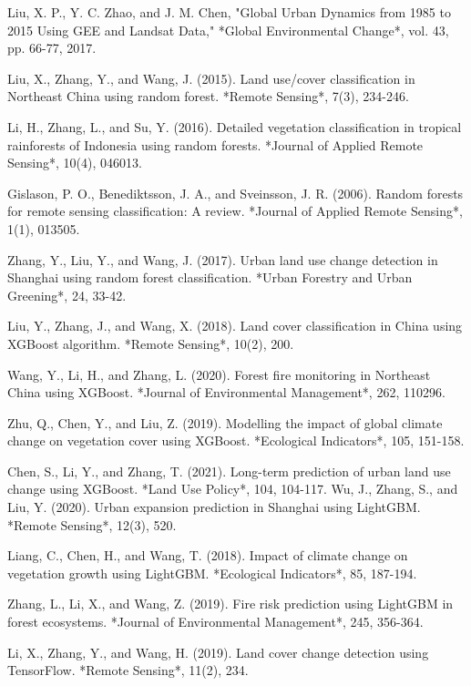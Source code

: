 \documentclass{article}
\begin{document}
\begin{thebibliography}{99}
 Liu, X. P., Y. C. Zhao, and J. M. Chen, "Global Urban Dynamics from 1985 to 2015 Using GEE and Landsat Data," *Global Environmental Change*, vol. 43, pp. 66-77, 2017.


Liu, X., Zhang, Y., and Wang, J. (2015). Land use/cover classification in Northeast China using random forest. *Remote Sensing*, 7(3), 234-246.

Li, H., Zhang, L., and Su, Y. (2016). Detailed vegetation classification in tropical rainforests of Indonesia using random forests. *Journal of Applied Remote Sensing*, 10(4), 046013.

Gislason, P. O., Benediktsson, J. A., and Sveinsson, J. R. (2006). Random forests for remote sensing classification: A review. *Journal of Applied Remote Sensing*, 1(1), 013505.

Zhang, Y., Liu, Y., and Wang, J. (2017). Urban land use change detection in Shanghai using random forest classification. *Urban Forestry and Urban Greening*, 24, 33-42.

Liu, Y., Zhang, J., and Wang, X. (2018). Land cover classification in China using XGBoost algorithm. *Remote Sensing*, 10(2), 200.

Wang, Y., Li, H., and Zhang, L. (2020). Forest fire monitoring in Northeast China using XGBoost. *Journal of Environmental Management*, 262, 110296.

Zhu, Q., Chen, Y., and Liu, Z. (2019). Modelling the impact of global climate change on vegetation cover using XGBoost. *Ecological Indicators*, 105, 151-158.

Chen, S., Li, Y., and Zhang, T. (2021). Long-term prediction of urban land use change using XGBoost. *Land Use Policy*, 104, 104-117.
Wu, J., Zhang, S., and Liu, Y. (2020). Urban expansion prediction in Shanghai using LightGBM. *Remote Sensing*, 12(3), 520.

Liang, C., Chen, H., and Wang, T. (2018). Impact of climate change on vegetation growth using LightGBM. *Ecological Indicators*, 85, 187-194.

Zhang, L., Li, X., and Wang, Z. (2019). Fire risk prediction using LightGBM in forest ecosystems. *Journal of Environmental Management*, 245, 356-364.

	
Li, X., Zhang, Y., and Wang, H. (2019). Land cover change detection using TensorFlow. *Remote Sensing*, 11(2), 234.


\end{thebibliography}
\end{document}
